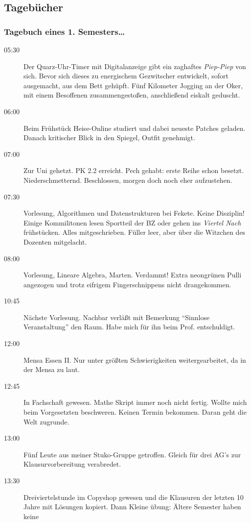 \begin{multicols}{2}
\subsection{Tagebücher}
	\subsubsection{Tagebuch eines 1. Semesters\ldots}
		\begin{description}
			\item[05:30] Der Quarz-Uhr-Timer mit Digitalanzeige gibt ein zaghaftes \emph{Piep-Piep} von sich. Bevor sich dieses zu energischem Gezwitscher entwickelt, sofort ausgemacht, aus dem Bett gehüpft. Fünf Kilometer Jogging an der Oker, mit einem Besoffenen zusammengestoßen, anschließend eiskalt geduscht.
			\item[06:00] Beim Frühstück Heise-Online studiert und dabei neueste Patches geladen. Danach kritischer Blick in den Spiegel, Outfit genehmigt.
			\item[07:00] Zur Uni gehetzt. PK 2.2 erreicht. Pech gehabt: erste Reihe schon besetzt. Niederschmetternd. Beschlossen, morgen doch noch eher aufzustehen.
			\item[07:30] Vorlesung, Algorithmen und Datenstrukturen bei Fekete. Keine Disziplin! Einige Kommilitonen lesen Sportteil der BZ oder gehen ins \emph{Viertel Nach} frühstücken. Alles mitgeschrieben. Füller leer, aber über die Witzchen des Dozenten mitgelacht.
			\item[08:00] Vorlesung, Lineare Algebra, Marten. Verdammt! Extra neongrünen Pulli angezogen und trotz eifrigem Fingerschnippens nicht drangekommen.
			\item[10:45] Nächste Vorlesung. Nachbar verläßt mit Bemerkung \enquote{Sinnlose Veranstaltung} den Raum. Habe mich für ihn beim Prof. entschuldigt.
			\item[12:00] Mensa Essen II. Nur unter größten Schwierigkeiten weitergearbeitet, da in der Mensa zu laut.
			\item[12:45] In Fachschaft gewesen. Mathe Skript immer noch nicht fertig. Wollte mich beim Vorgesetzten beschweren. Keinen Termin bekommen. Daran geht die Welt zugrunde.
			\item[13:00] Fünf Leute aus meiner Stuko-Gruppe getroffen. Gleich für drei AG's zur Klausurvorbereitung verabredet.
\item[13:30] Dreiviertelstunde im Copyshop gewesen und die Klausuren der letzten 10
Jahre mit Lösungen kopiert. Dann Kleine übung: Ältere Semester haben keine

\end{description}
\end{multicols}
